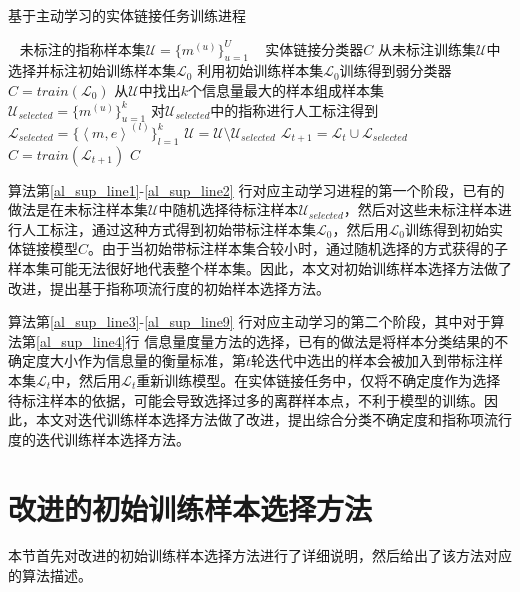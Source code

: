 \renewcommand{\algorithmicrequire}{\textbf{输入:}} %
\renewcommand{\algorithmicensure}{\textbf{输出:}} %
\begin{algorithm}[!htb]
	\caption{基于主动学习的实体链接任务训练进程}
	\label{algorithm_AL}
	\begin{algorithmic}[1] %
		\REQUIRE ~ %
		未标注的指称样本集$ \mathcal{U}=\{m^{(u)} \}_{u=1}^U $
		\ENSURE ~ %
		实体链接分类器$C$
		\STATE 从未标注训练集$\mathcal{U}$中选择并标注初始训练样本集$\mathcal{L}_0$\label{al_sup_line1}
		\STATE 利用初始训练样本集$\mathcal{L}_{0}$训练得到弱分类器$C=train(\mathcal{L}_{0})$\label{al_sup_line2}
		\REPEAT \label{al_sup_line3}
		\STATE 从$\mathcal{U}$中找出$k$个信息量最大的样本组成样本集$ \mathcal{U}_{selected} = \{m^{(u)} \}_{u=1}^{k} $\label{al_sup_line4}
		\STATE 对$ \mathcal{U}_{selected}$中的指称进行人工标注得到$ \mathcal{L}_{selected} = \{\left\langle m,e\right\rangle^{(l)} \}_{l=1}^{k} $
		\STATE $ \mathcal{U} = \mathcal{U} \setminus \mathcal{U}_{selected} $
		\STATE $ \mathcal{L}_{t+1} = \mathcal{L}_{t} \cup \mathcal{L}_{selected} $
		\STATE $C=train(\mathcal{L}_{t+1})$
		 \label{al_sup_line9}
		\RETURN $C$
	\end{algorithmic}
\end{algorithm}

算法第\ref{al_sup_line1}-\ref{al_sup_line2} 行对应主动学习进程的第一个阶段，已有的做法是在未标注样本集$\mathcal{U}$中随机选择待标注样本$\mathcal{U}_{selected}$，然后对这些未标注样本进行人工标注，通过这种方式得到初始带标注样本集$\mathcal{L}_0$，然后用$\mathcal{L}_0$训练得到初始实体链接模型$C$。由于当初始带标注样本集合较小时，通过随机选择的方式获得的子样本集可能无法很好地代表整个样本集。因此，本文对初始训练样本选择方法做了改进，提出基于指称项流行度的初始样本选择方法。

算法第\ref{al_sup_line3}-\ref{al_sup_line9} 行对应主动学习的第二个阶段，其中对于算法第\ref{al_sup_line4}行 信息量度量方法的选择，已有的做法是将样本分类结果的不确定度大小作为信息量的衡量标准，第$t$轮迭代中选出的样本会被加入到带标注样本集$\mathcal{L}_t$中，然后用$\mathcal{L}_t$重新训练模型。在实体链接任务中，仅将不确定度作为选择待标注样本的依据，可能会导致选择过多的离群样本点，不利于模型的训练。因此，本文对迭代训练样本选择方法做了改进，提出综合分类不确定度和指称项流行度的迭代训练样本选择方法。

\section{改进的初始训练样本选择方法}\label{section:al_init_gen}
本节首先对改进的初始训练样本选择方法进行了详细说明，然后给出了该方法对应的算法描述。


